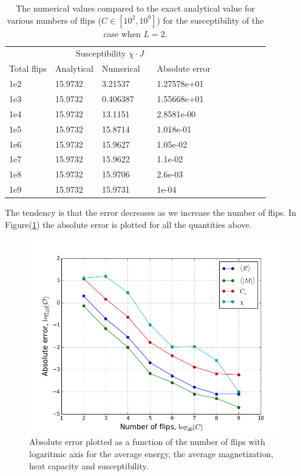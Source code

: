 \documentclass[norsk,a4paper,12pt]{article}
\begin{document}
\begin{table}[H]
\centering
\caption{The numerical values compared to the exact analytical value for various numbers of flips ($C\in[10^2,10^9]$) for the susceptibility of the case when $L=2$.}
\label{tab:benchmark4} 
\begin{tabularx}{\textwidth}{XlXrXrXrXrX}
&&&&\\
\toprule
\multicolumn{5}{c}{Susceptibility $\chi\cdot J$}\\
\cline{2-3}
Total flips  & Analytical  & Numerical && Absolute error\\
\midrule
1e2   & 15.9732  & 3.21537   && 1.27578e+01\\
1e3   & 15.9732  & 0.406387  && 1.55668e+01\\
1e4   & 15.9732  & 13.1151   && 2.8581e-00\\
1e5   & 15.9732  & 15.8714   && 1.018e-01\\
1e6   & 15.9732  & 15.9627   && 1.05e-02\\
1e7 	  & 15.9732  & 15.9622   && 1.1e-02\\
1e8   & 15.9732  & 15.9706   && 2.6e-03\\
1e9   & 15.9732  & 15.9731   && 1e-04 \\
\bottomrule
\end{tabularx}
\end{table}
The tendency is that the error decreases as we increase the number of flips. In Figure(\ref{error}) the absolute error is plotted for all the quantities above.

\begin{figure}[H]
\centering
\includegraphics[width=120mm]{error_plot.png}
\caption{Absolute error plotted as a function of the number of flips with logaritmic axis for the average energy, the average magnetization, heat capacity and susceptibility.\label{error}}
\end{figure}
\end{document}
